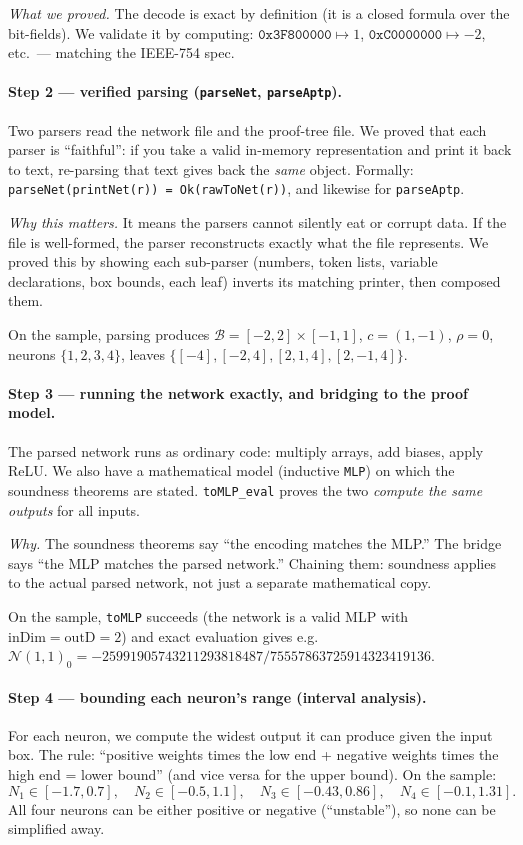 \documentclass[runningheads]{llncs}
\newcommand{\net}{\mathcal{N}}
\newcommand{\dom}{\mathcal{B}}          %
\newcommand{\code}[1]{\texttt{#1}}
\begin{document}
\emph{What we proved.} The decode is exact by definition (it is a closed formula over
the bit-fields). We validate it by computing: $\mathtt{0x3F800000}\mapsto1$,
$\mathtt{0xC0000000}\mapsto-2$, etc.\ --- matching the IEEE-754 spec.

\paragraph{Step 2 --- verified parsing (\code{parseNet}, \code{parseAptp}).}
Two parsers read the network file and the proof-tree file. We proved that each parser
is ``faithful'': if you take a valid in-memory representation and print it back to
text, re-parsing that text gives back the \emph{same} object. Formally:
\code{parseNet(printNet(r)) = Ok(rawToNet(r))}, and likewise for \code{parseAptp}.

\emph{Why this matters.} It means the parsers cannot silently eat or corrupt data. If
the file is well-formed, the parser reconstructs exactly what the file represents. We
proved this by showing each sub-parser (numbers, token lists, variable declarations,
box bounds, each leaf) inverts its matching printer, then composed them.

On the sample, parsing produces $\dom=[-2,2]\times[-1,1]$, $c=(1,-1)$, $\rho=0$,
neurons $\{1,2,3,4\}$, leaves $\{[-4],[-2,4],[2,1,4],[2,-1,4]\}$.

\paragraph{Step 3 --- running the network exactly, and bridging to the proof model.}
The parsed network runs as ordinary code: multiply arrays, add biases, apply ReLU. We
also have a mathematical model (inductive \code{MLP}) on which the soundness theorems
are stated. \code{toMLP\_eval} proves the two \emph{compute the same outputs} for all
inputs.

\emph{Why.} The soundness theorems say ``the encoding matches the MLP.'' The bridge
says ``the MLP matches the parsed network.'' Chaining them: soundness applies to the
actual parsed network, not just a separate mathematical copy.

On the sample, \code{toMLP} succeeds (the network is a valid MLP with $\text{inDim}=
\text{outD}=2$) and exact evaluation gives e.g.\ $\net(1,1)_0 =
-25991905743211293818487/75557863725914323419136$.

\paragraph{Step 4 --- bounding each neuron's range (interval analysis).}
For each neuron, we compute the widest output it can produce given the input box. The
rule: ``positive weights times the low end + negative weights times the high end =
lower bound'' (and vice versa for the upper bound). On the sample:
\[
N_1\!\in\![-1.7,0.7],\quad N_2\!\in\![-0.5,1.1],\quad
N_3\!\in\![-0.43,0.86],\quad N_4\!\in\![-0.1,1.31].
\]
All four neurons can be either positive or negative (``unstable''), so none can be
simplified away.
\end{document}
